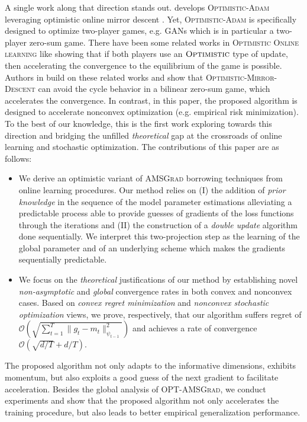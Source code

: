 \documentclass[11pt]{article}
\theoremstyle{k}
\begin{document}
A single work along that direction stands out. \citep{DISZ18} develops \textsc{Optimistic-Adam} leveraging optimistic online mirror descent \citep{RS13b}.
Yet, \textsc{Optimistic-Adam} is specifically designed to optimize two-player games, e.g. GANs \citep{goodfellow2014generative} which is in particular a two-player zero-sum game. There have been some related works in \textsc{Optimistic Online learning} like \citep{CJ12,RS13b,SALS15} showing that if both players use an $\textsc{Optimistic}$ type of update, then accelerating the convergence to the equilibrium of the game is possible.
Authors in \citep{DISZ18} build on these related works and show that \textsc{Optimistic-Mirror-Descent} can avoid the cycle behavior in a bilinear zero-sum game, which accelerates the convergence. 
In contrast, in this paper, the proposed algorithm is designed to accelerate nonconvex optimization (e.g. empirical risk minimization).
To the best of our knowledge, this is the first work exploring towards this direction and bridging the unfilled \emph{theoretical} gap at the crossroads of online learning and stochastic optimization.
The contributions of this paper are as follows:
\begin{itemize}
\item We derive an optimistic variant of \textsc{AMSGrad} borrowing techniques from online learning procedures. Our method relies on \textsf{(I)} the addition of \emph{prior knowledge} in the sequence of the model parameter estimations alleviating a predictable process able to provide guesses of gradients of the loss functions through the iterations and \textsf{(II)} the construction of a \emph{double update} algorithm done sequentially. We interpret this two-projection step as the learning of the global parameter and of an underlying scheme which makes the gradients sequentially predictable.
\item We focus on the  \emph{theoretical} justifications of our method by establishing novel \emph{non-asymptotic} and \emph{global} convergence rates in both convex and nonconvex cases.  Based on \emph{convex regret minimization} and \emph{nonconvex stochastic optimization} views, we prove, respectively, that our algorithm suffers regret of $\mathcal{O}(\sqrt{\sum_{t=1}^T \| g_t - m_t  \|^2_{\psi_{t-1}}})$ and achieves a rate of convergence $\mathcal{O}(\sqrt{d/T} +d/T )$.
\end{itemize}
The proposed algorithm not only adapts to the informative dimensions, exhibits momentum, but also exploits a good guess of the next gradient to facilitate acceleration. 
Besides the global analysis of \textsc{OPT-AMSGrad}, we conduct experiments and show that the proposed algorithm not only accelerates the training procedure, but also leads to better empirical generalization performance.
\end{document}

